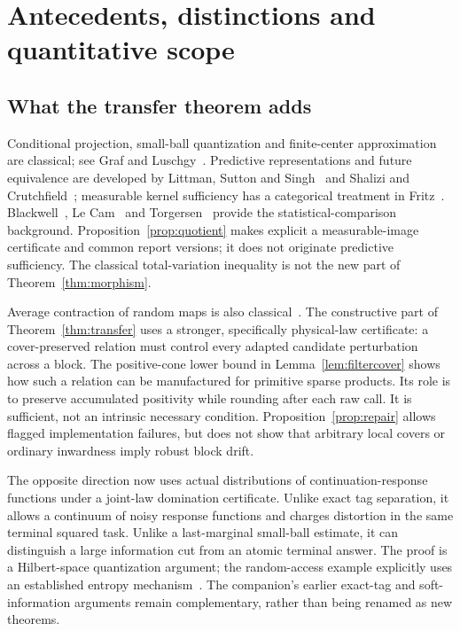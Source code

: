 \section{Antecedents, distinctions and quantitative scope}\label{sec:literature}
\subsection{What the transfer theorem adds}
Conditional projection, small-ball quantization and finite-center approximation are classical; see Graf and Luschgy~\cite{graf}. Predictive representations and future equivalence are developed by Littman, Sutton and Singh~\cite{psr} and Shalizi and Crutchfield~\cite{shalizi}; measurable kernel sufficiency has a categorical treatment in Fritz~\cite{fritz}. Blackwell~\cite{blackwell}, Le Cam~\cite{lecam} and Torgersen~\cite{torgersen} provide the statistical-comparison background. Proposition~\ref{prop:quotient} makes explicit a measurable-image certificate and common report versions; it does not originate predictive sufficiency. The classical total-variation inequality is not the new part of Theorem~\ref{thm:morphism}.

Average contraction of random maps is also classical~\cite{diaconis}. The constructive part of Theorem~\ref{thm:transfer} uses a stronger, specifically physical-law certificate: a cover-preserved relation must control every adapted candidate perturbation across a block. The positive-cone lower bound in Lemma~\ref{lem:filtercover} shows how such a relation can be manufactured for primitive sparse products. Its role is to preserve accumulated positivity while rounding after each raw call. It is sufficient, not an intrinsic necessary condition. Proposition~\ref{prop:repair} allows flagged implementation failures, but does not show that arbitrary local covers or ordinary inwardness imply robust block drift.

The opposite direction now uses actual distributions of continuation-response functions under a joint-law domination certificate. Unlike exact tag separation, it allows a continuum of noisy response functions and charges distortion in the same terminal squared task. Unlike a last-marginal small-ball estimate, it can distinguish a large information cut from an atomic terminal answer. The proof is a Hilbert-space quantization argument; the random-access example explicitly uses an established entropy mechanism~\cite{nayak}. The companion's earlier exact-tag and soft-information arguments remain complementary, rather than being renamed as new theorems.

